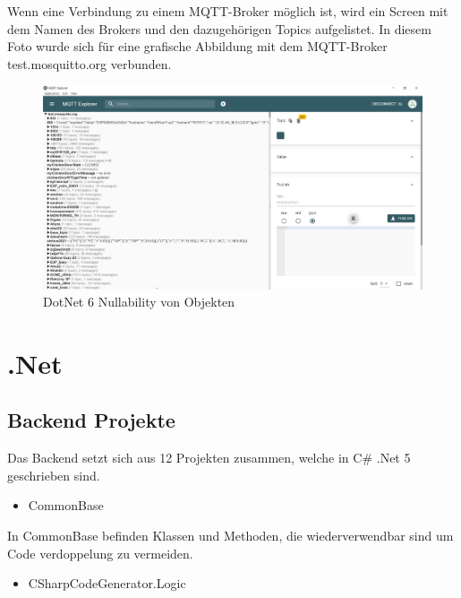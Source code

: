  Wenn eine Verbindung zu einem MQTT-Broker möglich ist, wird ein Screen mit dem Namen des Brokers und den dazugehörigen Topics aufgelistet. 
 In diesem Foto wurde sich für eine grafische Abbildung mit dem MQTT-Broker test.mosquitto.org verbunden.  

 \begin{figure}[H]
    \centering
    \includegraphics[width=1\textwidth]{pics/MQTTExplorerTestDemo.JPG}
    \caption{DotNet 6 Nullability von Objekten}
\end{figure}








\section{.Net}

\subsection {Backend Projekte}



Das Backend setzt sich aus 12 Projekten zusammen, welche in C\# .Net 5 geschrieben sind.

\begin{itemize}
    \item CommonBase
\end{itemize}

In CommonBase befinden Klassen und Methoden, die wiederverwendbar sind um Code verdoppelung zu vermeiden.

\begin{itemize}
    \item CSharpCodeGenerator.Logic
\end{itemize}


